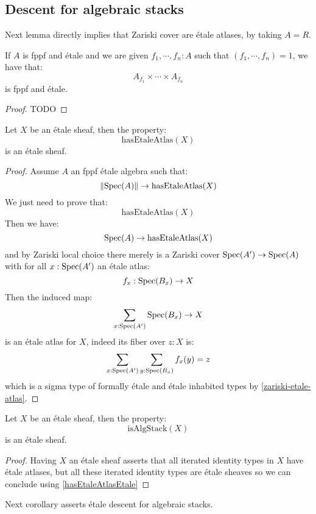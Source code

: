 \subsection{Descent for algebraic stacks}

Next lemma directly implies that Zariski cover are étale atlases, by taking $A=R$. 

\begin{lemma}\label{zariski-etale-atlas}
If $A$ is fppf and étale and we are given $f_1,\cdots,f_n:A$ such that $(f_1,\cdots,f_n)=1$, we have that:
\[A_{f_1}\times\cdots\times A_{f_n}\]
is fppf and étale.
\end{lemma}

\begin{proof}
TODO
\end{proof}

\begin{proposition}\label{hasEtaleAtlasEtale}
Let $X$ be an étale sheaf, then the property:
\[\mathrm{hasEtaleAtlas}(X)\]
is an étale sheaf.
\end{proposition}

\begin{proof}
Assume $A$ an fppf étale algebra such that:
\[\lVert \operatorname{Spec}(A) \rVert \to \mathrm{hasEtaleAtlas}(X)\]
We just need to prove that:
\[\mathrm{hasEtaleAtlas}(X)\]
Then we have:
\[\operatorname{Spec}(A) \to \mathrm{hasEtaleAtlas}(X)\]
and by Zariski local choice there merely is a Zariski cover $\operatorname{Spec}(A') \to \operatorname{Spec}(A)$ with for all $x:\operatorname{Spec}(A')$ an étale atlas:
\[f_x : \operatorname{Spec}(B_x)\to X\]
Then the induced map:
\[\sum_{x:\operatorname{Spec}(A')}\operatorname{Spec}(B_x)\to X\]
is an étale atlas for $X$, indeed its fiber over $z:X$ is:
\[\sum_{x:\operatorname{Spec}(A')}\sum_{y:\operatorname{Spec}(B_x)} f_x(y) = z\]
which is a sigma type of formally étale and étale inhabited types by \cref{zariski-etale-atlas}.
\end{proof}

\begin{corollary}\label{isAlgebraicStackEtale}
Let $X$ be an étale sheaf, then the property:
\[\mathrm{isAlgStack}(X)\]
is an étale sheaf.
\end{corollary}

\begin{proof}
Having $X$ an étale sheaf asserts that all iterated identity types in $X$ have étale atlases, but all these iterated identity types are étale sheaves so we can conclude using \cref{hasEtaleAtlasEtale}
\end{proof}

Next corollary asserts étale descent for algebraic stacks.

